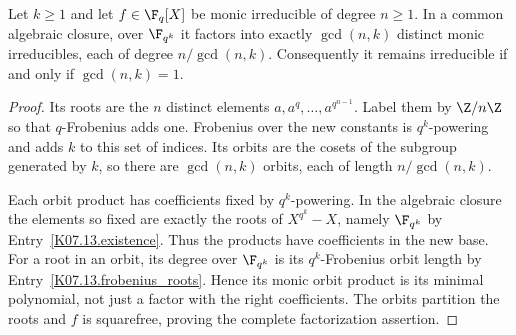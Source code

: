 \begin{theorem}
Let $k\geq1$ and let $f\in\F_q[X]$ be monic irreducible of degree $n\geq1$. In a common algebraic closure, over $\F_{q^k}$ it factors into exactly $\gcd(n,k)$ distinct monic irreducibles, each of degree $n/\gcd(n,k)$. Consequently it remains irreducible if and only if $\gcd(n,k)=1$.
\end{theorem}
\begin{proof}
Its roots are the $n$ distinct elements $a,a^q,\ldots,a^{q^{n-1}}$. Label them by $\Z/n\Z$ so that $q$-Frobenius adds one. Frobenius over the new constants is $q^k$-powering and adds $k$ to this set of indices. Its orbits are the cosets of the subgroup generated by $k$, so there are $\gcd(n,k)$ orbits, each of length $n/\gcd(n,k)$.

Each orbit product has coefficients fixed by $q^k$-powering. In the algebraic closure the elements so fixed are exactly the roots of $X^{q^k}-X$, namely $\F_{q^k}$ by Entry~\ref{K07.13.existence}. Thus the products have coefficients in the new base. For a root in an orbit, its degree over $\F_{q^k}$ is its $q^k$-Frobenius orbit length by Entry~\ref{K07.13.frobenius_roots}. Hence its monic orbit product is its minimal polynomial, not just a factor with the right coefficients. The orbits partition the roots and $f$ is squarefree, proving the complete factorization assertion.
\end{proof}

